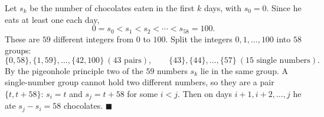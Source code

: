 Let $s_k$ be the number of chocolates eaten in the first $k$ days, with $s_0=0$. Since he eats at least one each day,
\[0=s_0<s_1<s_2<\cdots<s_{58}=100.\]
These are $59$ different integers from $0$ to $100$. Split the integers $0,1,\dots,100$ into $58$ groups:
\[\{0,58\},\{1,59\},\dots,\{42,100\}\ (43\text{ pairs}),\qquad\{43\},\{44\},\dots,\{57\}\ (15\text{ single numbers}).\]
By the pigeonhole principle two of the $59$ numbers $s_k$ lie in the same group. A single-number group cannot hold two different numbers, so they are a pair $\{t,t+58\}$: $s_i=t$ and $s_j=t+58$ for some $i<j$. Then on days $i+1,i+2,\dots,j$ he ate $s_j-s_i=58$ chocolates. $\blacksquare$
